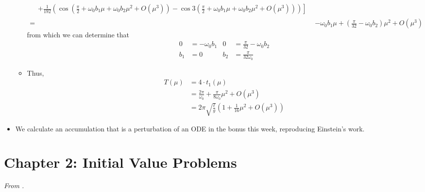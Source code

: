 \documentclass[../notes.tex]{subfiles}
\begin{document}
\begin{itemize}
\begin{itemize}
\begin{align*}
\begin{split}
                &+ \left. \frac{1}{192}\left( \cos(\frac{\pi}{2}+\omega_0b_1\mu+\omega_0b_2\mu^2+O(\mu^3))-\cos 3\left( \frac{\pi}{2}+\omega_0b_1\mu+\omega_0b_2\mu^2+O(\mu^3) \right) \right) \right]
            \end{split}\\
            ={}& -\omega_0b_1\mu+\left( \frac{\pi}{32}-\omega_0b_2 \right)\mu^2+O(\mu^3)
        \end{align*}
        from which we can determine that
        \begin{align*}
            0 &= -\omega_0b_1&
            0 &= \frac{\pi}{32}-\omega_0b_2\\
            b_1 &= 0&
            b_2 &= \frac{\pi}{32\omega_0}
        \end{align*}
        \item Thus,
        \begin{align*}
            T(\mu) &= 4\cdot t_1(\mu)\\
            &= \frac{2\pi}{\omega_0}+\frac{\pi}{8\omega_0}\mu^2+O(\mu^3)\\
            &= 2\pi\sqrt{\frac{\ell}{g}}\left( 1+\frac{1}{16}\mu^2+O(\mu^3) \right)
        \end{align*}
    \end{itemize}
    \item We calculate an accumulation that is a perturbation of an ODE in the bonus this week, reproducing Einstein's work.
\end{itemize}



\section{Chapter 2: Initial Value Problems}
\emph{From \textcite{bib:Teschl}.}
\end{document}
